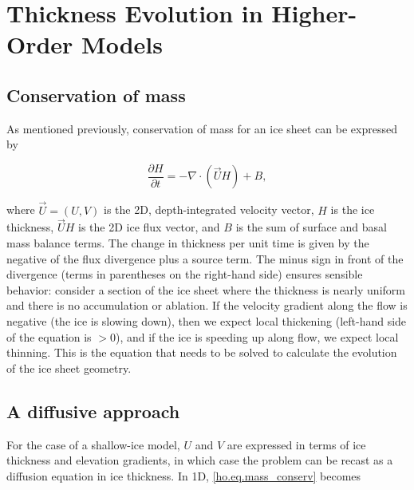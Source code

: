 
\section{Thickness Evolution in Higher-Order Models}
\label{sc:ho-thickness-evol}

\subsection{Conservation of mass}
As mentioned previously, conservation of mass for an ice sheet can be expressed by

\begin{equation}
\label{ho.eq.mass_conserv}
\frac{\partial H}{\partial t}=-\nabla \cdot \left( \vec{U}H \right)+B,
\end{equation}

\noindent
where $\vec{U}=(U,V)$ is the 2D, depth-integrated velocity vector, $H$ is the ice thickness, $\vec{U}H$ is the 2D ice flux vector, and $B$ is the sum of surface and basal mass balance terms. The change in thickness per unit time is given by the negative of the flux divergence plus a source term. 
%
%
The minus sign in front of the divergence (terms in parentheses on the right-hand side) ensures sensible behavior: consider a section of the ice sheet where the thickness is nearly uniform and there is no accumulation or ablation. If the velocity gradient along the flow is negative (the ice is slowing down), then we expect local thickening (left-hand side of the equation is $>0$), and if the ice is speeding up along flow, we expect local thinning. This is the equation that needs to be solved to calculate the evolution of the ice sheet geometry.

\subsection{A diffusive approach}
For the case of a shallow-ice model, $U$ and $V$ are expressed in terms of ice thickness and elevation gradients, in which case the problem can be recast as a diffusion equation in ice thickness. In 1D, \eqref{ho.eq.mass_conserv} becomes

